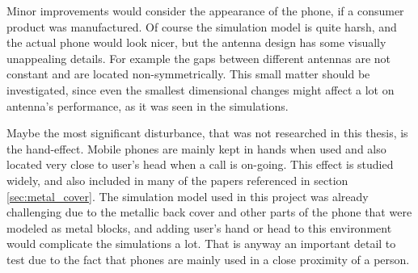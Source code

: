 Minor improvements would consider the appearance of the phone, if a consumer product was manufactured. Of course the simulation model is quite harsh, and the actual phone would look nicer, but the antenna design has some visually unappealing details. For example the gaps between different antennas are not constant and are located non-symmetrically. This small matter should be investigated, since even the smallest dimensional changes might affect a lot on antenna's performance, as it was seen in the simulations.

Maybe the most significant disturbance, that was not researched in this thesis, is the hand-effect. Mobile phones are mainly kept in hands when used and also located very close to user's head when a call is on-going. This effect is studied widely, and also included in many of the papers referenced in section \ref{sec:metal_cover}. The simulation model used in this project was already challenging due to the metallic back cover and other parts of the phone that were modeled as metal blocks, and adding user's hand or head to this environment would complicate the simulations a lot. That is anyway an important detail to test due to the fact that phones are mainly used in a close proximity of a person.


\clearpage